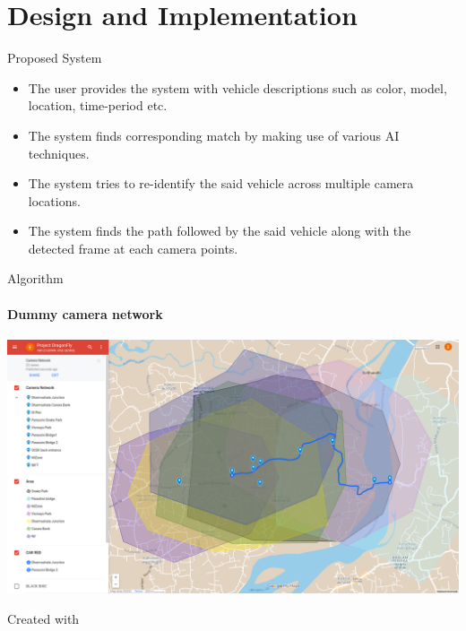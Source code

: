 \documentclass{beamer}
\newcommand{\link}[2]{\href{#1}{\textit{\color{blue}{#2}}}}%
\begin{document}
	\section{Design and Implementation}
	\begin{frame}{Proposed System}
		\begin{itemize}
			\item The user provides the system with vehicle descriptions such as color, model, location, time-period etc. 
			\item The system finds corresponding match by making use of various AI techniques. 
			\item The system tries to re-identify the said vehicle across multiple camera locations.
			\item The system finds the path followed by the said vehicle along with the detected frame at each camera points.
		\end{itemize}
	\end{frame}

	\begin{frame}{Algorithm}
		\framesubtitle{Dummy camera network}
		\begin{center}
			\includegraphics[height=0.7\textheight]{res/camera_network_demo.png}
		\end{center}
		Created with \link{https://www.google.com/maps/d/edit?mid=1s2ST5x4nn-EK3JqU-c9EEGASRq5Ini0&usp=sharing}{Google Maps}
	\end{frame}
	
\end{document}
